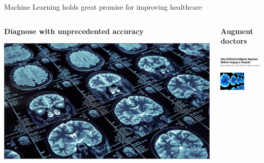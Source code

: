 \documentclass[8pt,xcolor=table,aspectratio=169]{beamer}
\begin{document}
\begin{frame}{Machine Learning holds great promise for improving healthcare}

\begin{columns}
 \begin{column}[t]{0.5\textwidth}
 \centering
 \textbf{\large{Diagnose with unprecedented accuracy}}
 \vo
  
  \includegraphics[width=0.75\columnwidth, trim=0 370 0 0, clip]{ai-diagnosis}

 
 \vt
 
 
 
 \end{column}
 \begin{column}[t]{0.5\textwidth}
 \centering
 \textbf{\large{Augment doctors}}
 \vo
 
 \vt
 
 \includegraphics[height=0.9cm, trim=4 4 4 4, clip]{ai_improves_imaging_title2}\includegraphics[height=0.9cm, trim=8 8 8 8, clip]{ai_improves_imaging_photo} 
 \vspace{2em}

  
 
 \end{column}

\end{columns}



 
\end{frame}
\end{document}
